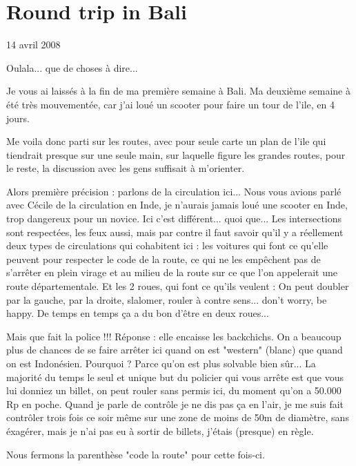 \section{Round trip in Bali}

14 avril 2008

\begin{multicols}{2}

Oulala... que de choses à dire...

Je vous ai laissés à la fin de ma première semaine à Bali. Ma deuxième semaine à été très mouvementée, car j'ai loué un scooter pour faire un tour de l'ile, en 4 jours.

Me voila donc parti sur les routes, avec pour seule carte un plan de l'ile qui tiendrait presque sur une seule main, sur laquelle figure les grandes routes, pour le reste, la discussion avec les gens suffisait à m'orienter.

Alors première précision : parlons de la circulation ici... Nous vous avions parlé avec Cécile de la circulation en Inde, je n'aurais jamais loué une scooter en Inde, trop dangereux pour un novice. Ici c'est différent... quoi que... Les intersections sont respectées, les feux aussi, mais par contre il faut savoir qu'il y a réellement deux types de circulations qui cohabitent ici : les voitures qui font ce qu'elle peuvent pour respecter le code de la route, ce qui ne les empêchent pas de s'arrêter en plein virage et au milieu de la route sur ce que l'on appelerait une route départementale. Et les 2 roues, qui font ce qu'ils veulent : On peut doubler par la gauche, par la droite, slalomer, rouler à contre sens... don't worry, be happy. De temps en temps ça a du bon d'être en deux roues...

Mais que fait la police !!! Réponse : elle encaisse les backchichs. On a beaucoup plus de chances de se faire arrêter ici quand on est "western" (blanc) que quand on est Indonésien. Pourquoi ? Parce qu'on est plus solvable bien sûr... La majorité du temps le seul et unique but du policier qui vous arrête est que vous lui donniez un billet, on peut rouler sans permis ici, du moment qu'on a 50.000 Rp en poche. Quand je parle de contrôle je ne dis pas ça en l'air, je me suis fait contrôler trois fois ce soir même sur une zone de moins de 50m de diamètre, sans éxagérer, mais je n'ai pas eu à sortir de billets, j'étais (presque) en règle.

Nous fermons la parenthèse "code la route" pour cette fois-ci.




\end{multicols}
